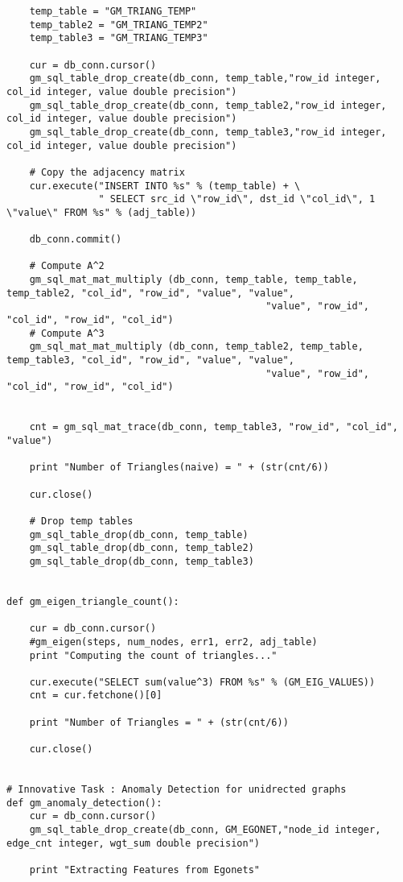 \begin{lstlisting}
    temp_table = "GM_TRIANG_TEMP"
    temp_table2 = "GM_TRIANG_TEMP2"
    temp_table3 = "GM_TRIANG_TEMP3"

    cur = db_conn.cursor()
    gm_sql_table_drop_create(db_conn, temp_table,"row_id integer, col_id integer, value double precision")
    gm_sql_table_drop_create(db_conn, temp_table2,"row_id integer, col_id integer, value double precision")
    gm_sql_table_drop_create(db_conn, temp_table3,"row_id integer, col_id integer, value double precision")

    # Copy the adjacency matrix
    cur.execute("INSERT INTO %s" % (temp_table) + \
                " SELECT src_id \"row_id\", dst_id \"col_id\", 1 \"value\" FROM %s" % (adj_table))

    db_conn.commit()

    # Compute A^2
    gm_sql_mat_mat_multiply (db_conn, temp_table, temp_table, temp_table2, "col_id", "row_id", "value", "value",
                                             "value", "row_id", "col_id", "row_id", "col_id")
    # Compute A^3
    gm_sql_mat_mat_multiply (db_conn, temp_table2, temp_table, temp_table3, "col_id", "row_id", "value", "value",
                                             "value", "row_id", "col_id", "row_id", "col_id")


    cnt = gm_sql_mat_trace(db_conn, temp_table3, "row_id", "col_id", "value")

    print "Number of Triangles(naive) = " + (str(cnt/6))

    cur.close()

    # Drop temp tables
    gm_sql_table_drop(db_conn, temp_table)
    gm_sql_table_drop(db_conn, temp_table2)
    gm_sql_table_drop(db_conn, temp_table3)


def gm_eigen_triangle_count():

    cur = db_conn.cursor()
    #gm_eigen(steps, num_nodes, err1, err2, adj_table)
    print "Computing the count of triangles..."

    cur.execute("SELECT sum(value^3) FROM %s" % (GM_EIG_VALUES))
    cnt = cur.fetchone()[0]

    print "Number of Triangles = " + (str(cnt/6))

    cur.close()


# Innovative Task : Anomaly Detection for unidrected graphs
def gm_anomaly_detection():
    cur = db_conn.cursor()
    gm_sql_table_drop_create(db_conn, GM_EGONET,"node_id integer, edge_cnt integer, wgt_sum double precision")

    print "Extracting Features from Egonets"


\end{lstlisting}
